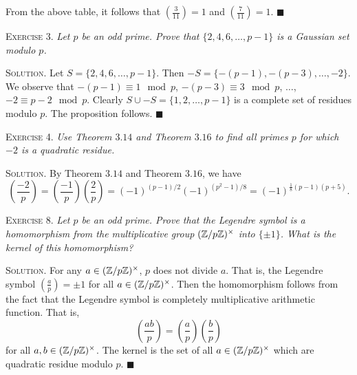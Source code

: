 \documentclass[11pt, leqno]{article}
\newcommand{\done}{\ensuremath{\blacksquare}}
\begin{document}
From the above table, it follows that $\left(\frac{3}{11}\right) = 1$ and $\left(\frac{7}{11}\right) = 1$. \done

\textsc{Exercise 3}. \emph{Let $p$ be an odd prime. Prove that $\{2, 4, 6, \ldots, p-1\}$ is a Gaussian set modulo $p$.}

\textsc{Solution}. Let $S=\{2, 4, 6, \ldots, p-1\} $. Then $-S = \{-(p-1), -(p-3), \ldots, -2\}$. We observe that $-(p-1) \equiv 1 \mod p$, $-(p-3) \equiv 3 \mod p$, $\ldots$, $-2 \equiv p-2 \mod p$. Clearly $S\cup -S = \{1, 2, \ldots, p-1\}$ is a complete set of residues modulo $p$. The proposition follows. \done

\textsc{Exercise 4}. \emph{Use Theorem $3.14$ and Theorem $3.16$ to find all primes $p$ for which $-2$ is a quadratic residue.}

\textsc{Solution}. By Theorem $3.14$ and Theorem $3.16$, we have 
\begin{displaymath}
\left( \frac{-2}{p} \right) = \left( \frac{-1}{p} \right) \left( \frac{2}{p} \right) = (-1)^{(p-1)/2}(-1)^{(p^2-1)/8} = (-1)^{\frac{1}{8}(p-1)(p+5)}.
\end{displaymath}



\textsc{Exercise 8}. \emph{Let $p$ be an odd prime. Prove that the Legendre symbol is a homomorphism from the multiplicative group $(\mathbb{Z}/p\mathbb{Z})^{\times}$ into $\{\pm 1\}$. What is the kernel of this homomorphism?}

\textsc{Solution}. For any $a\in (\mathbb{Z}/p\mathbb{Z})^{\times}$, $p$ does not divide $a$. That is, the Legendre symbol $\left( \frac{a}{p} \right) = \pm 1$ for all $a\in (\mathbb{Z}/p\mathbb{Z})^{\times}$. Then the homomorphism follows from the fact that the Legendre symbol is completely multiplicative arithmetic function. That is, 
\begin{displaymath}
\left( \frac{ab}{p} \right) = \left( \frac{a}{p} \right) \left( \frac{b}{p} \right)
\end{displaymath}
for all $a,b \in (\mathbb{Z}/p\mathbb{Z})^{\times}$. The kernel is the set of all $a\in (\mathbb{Z}/p\mathbb{Z})^{\times}$ which are quadratic residue modulo $p$. \done
\end{document}
